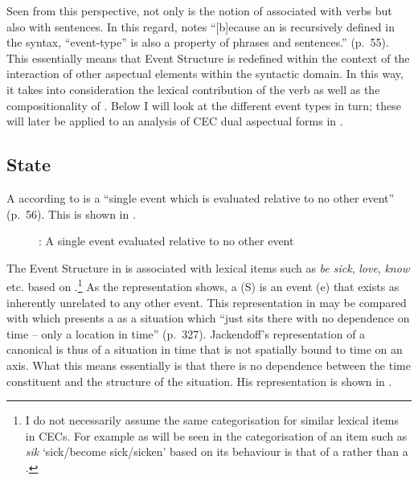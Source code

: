 Seen from this perspective, not only is the notion of 
associated with verbs but also with sentences.  In this regard,
\citet{Pustejovsky1991} notes ``[b]ecause an  is
recursively defined in the syntax, ``event-type” is also a property of
phrases and sentences.” (p.~55).  This essentially means that Event
Structure is redefined within the context of the interaction of other
aspectual elements within the syntactic domain.  In this way, it takes
into consideration the lexical contribution of the verb as well as the
compositionality of .  Below I will look at the different event
types in turn; these will later be applied to an analysis of CEC dual
aspectual forms in .

\subsection{State}\label{sec:4.2.2}

A  according to \citet{Pustejovsky1991} is a ``single event which
is evaluated relative to no other event” (p.~56).  This is shown in
.

\begin{figure}
\caption{: A single event evaluated relative to no other event \citep[56]{Pustejovsky1991}\label{ex:4:5}}
\fbox{\parbox{3cm}{\centering
\begin{forest} [S [e]] \end{forest}
}} 
\end{figure}

The Event Structure in  is associated with lexical
items such as \textit{be sick},  \textit{love}, \textit{know} etc. based on
\citet{Pustejovsky1991}.\footnote{I do not necessarily assume the same
  categorisation for similar lexical items in CECs. For example as
  will be seen in  the categorisation of an item such
  as \textit{sik} `sick\slash become sick\slash sicken' based on its behaviour is
  that of a  rather than a .}  As the representation
shows, a  (S) is an event (e) that exists as inherently unrelated
to any other event.  This representation in  may be
compared with \citet{Jackendoff1996} which presents a  as a
situation which ``just sits there with no dependence on time -- only a
location in time” (p.~327).  Jackendoff’s representation of a
canonical  is thus of a situation in time that is not spatially
bound to time on an axis.  What this means essentially is that there
is no dependence between the time constituent and the structure of the
situation.  His representation is shown in .

